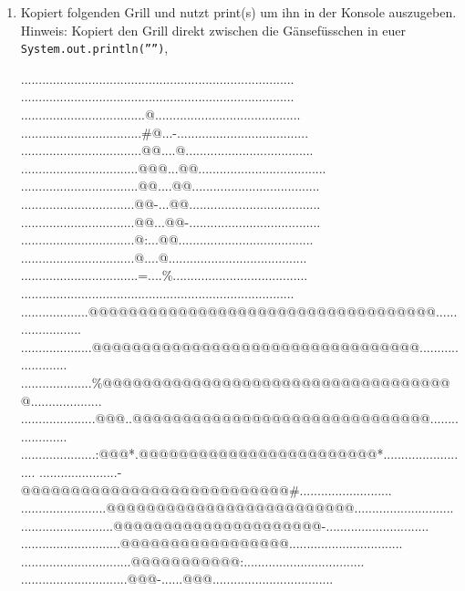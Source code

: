 \documentclass{../../sheet}
\begin{document}
\begin{enumerate}
    \item Kopiert folgenden Grill und nutzt print(s) um ihn in der Konsole auszugeben.\\
    Hinweis: Kopiert den Grill direkt zwischen die Gänsefüsschen in euer \texttt{System.out.println('''')},  
          \begin{ausgabe}
              .............................................................................
              .............................................................................
              ...................................@.........................................
              ..................................\#@...-.....................................
              ..................................@@....@....................................
              .................................@@@...@@....................................
              .................................@@....@@....................................
              ................................@@-...@@.....................................
              ................................@@...@@-.....................................
              ................................@:...@@......................................
              ................................@....@.......................................
              .................................=....\%......................................
              .............................................................................
              ...................@@@@@@@@@@@@@@@@@@@@@@@@@@@@@@@@@@@.......................
              ....................@@@@@@@@@@@@@@@@@@@@@@@@@@@@@@@@@........................
              ....................\%@@@@@@@@@@@@@@@@@@@@@@@@@@@@@@@@@@@@....................
              .....................@@@..@@@@@@@@@@@@@@@@@@@@@@@@@@@@@@.....................
              .....................:@@@*.@@@@@@@@@@@@@@@@@@@@@@@@*.........................
              ......................-@@@@@@@@@@@@@@@@@@@@@@@@@@@\#..........................
              ........................@@@@@@@@@@@@@@@@@@@@@@@@@............................
              ..........................@@@@@@@@@@@@@@@@@@@@@-.............................
              ............................@@@@@@@@@@@@@@@@@................................
              ...............................@@@@@@@@@@@:..................................
              ..............................@@@-......@@@..................................

\end{ausgabe}
\end{enumerate}
\end{document}
